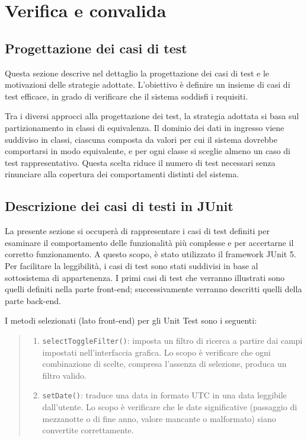 \chapter{Verifica e convalida} %

\label{Chapter3} %

\section{Progettazione dei casi di test}

Questa sezione descrive nel dettaglio la progettazione dei casi di test e le motivazioni delle strategie adottate. L’obiettivo è definire un insieme di casi di test efficace, in grado di verificare che il sistema soddisfi i requisiti.

Tra i diversi approcci alla progettazione dei test, la strategia adottata si basa sul partizionamento in classi di equivalenza. Il dominio dei dati in ingresso viene suddiviso in classi, ciascuna composta da valori per cui il sistema dovrebbe comportarsi in modo equivalente, e per ogni classe si sceglie almeno un caso di test rappresentativo. Questa scelta riduce il numero di test necessari senza rinunciare alla copertura dei comportamenti distinti del sistema.

\section{Descrizione dei casi di testi in JUnit}
La presente sezione si occuperà di rappresentare i casi di test definiti per esaminare il comportamento delle funzionalità più complesse e per accertarne il corretto funzionamento. A questo scopo, è stato utilizzato il framework JUnit 5. \\
\indent Per facilitare la leggibilità, i casi di test sono stati suddivisi in base al sottosistema di appartenenza. I primi casi di test che verranno illustrati sono quelli definiti nella parte front-end; successivamente verranno descritti quelli della parte back-end.

I metodi selezionati (lato front-end) per gli Unit Test sono i seguenti:

\begin{quote}
\begin{enumerate}[label=\textit{\arabic*}]
   \item \texttt{selectToggleFilter()}: imposta un filtro di ricerca a partire 
   dai campi impostati nell’interfaccia grafica. Lo scopo è verificare che ogni combinazione di scelte, compresa l’assenza di selezione, produca un filtro valido.
  
  \item \texttt{setDate()}: traduce una data in formato UTC in una data leggibile dall'utente. 
  Lo scopo è verificare che le date significative (passaggio di mezzanotte o di fine anno, valore mancante o malformato) 
  siano convertite correttamente.
\end{enumerate} 
\end{quote}

